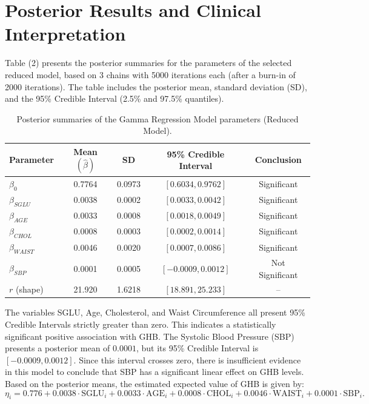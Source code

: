 \section{Posterior Results and Clinical Interpretation}
Table (2) presents the posterior summaries for the parameters of the selected reduced model, based on 3 chains with 5000 iterations each (after a burn-in of 2000 iterations). The table includes the posterior mean, standard deviation (SD), and the 95\% Credible Interval (2.5\% and 97.5\% quantiles).
\begin{table}[h!]
	\centering
	\begin{tabular}{lcccc}
		\toprule
		\textbf{Parameter} & \textbf{Mean} $(\hat{\beta})$ & \textbf{SD} & \textbf{95\% Credible Interval} & \textbf{Conclusion} \\
		\midrule
		$\beta_0$       & 0.7764 & 0.0973 & $[0.6034, 0.9762]$   & Significant \\
		$\beta_{SGLU}$  & 0.0038 & 0.0002 & $[0.0033, 0.0042]$   & Significant \\
		$\beta_{AGE}$   & 0.0033 & 0.0008 & $[0.0018, 0.0049]$   & Significant \\
		$\beta_{CHOL}$  & 0.0008 & 0.0003 & $[0.0002, 0.0014]$   & Significant \\
		$\beta_{WAIST}$ & 0.0046 & 0.0020 & $[0.0007, 0.0086]$   & Significant \\
		$\beta_{SBP}$   & 0.0001 & 0.0005 & $[-0.0009, 0.0012]$  & Not Significant \\
		$r$ (shape)     & 21.920 & 1.6218 & $[18.891, 25.233]$   & -- \\
		\bottomrule
	\end{tabular}
	\caption{Posterior summaries of the Gamma Regression Model parameters (Reduced Model).}
\end{table}

The variables SGLU, Age, Cholesterol, and Waist Circumference all present 95\% Credible Intervals strictly greater than zero. This indicates a statistically significant positive association with GHB. The Systolic Blood Pressure (SBP) presents a posterior mean of $0.0001$, but its 95\% Credible Interval is $[-0.0009, 0.0012]$. Since this interval crosses zero, there is insufficient evidence in this model to conclude that SBP has a significant linear effect on GHB levels. Based on the posterior means, the estimated expected value of GHB is given by:
\begin{equation*}
	\eta_i = 0.776 + 0.0038 \cdot \text{SGLU}_i + 0.0033 \cdot \text{AGE}_i + 0.0008 \cdot \text{CHOL}_i + 0.0046 \cdot \text{WAIST}_i + 0.0001 \cdot \text{SBP}_i.
\end{equation*}

